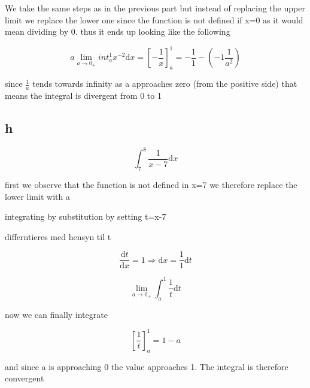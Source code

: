 \documentclass[12pt,a4paper]{article}
\begin{document}
We take the same steps as in the previous part but instead of replacing the upper limit we replace the lower one since the function is not defined if x=0 as it would mean dividing by 0. thus it ends up looking like the following


\begin{equation} \label{}
a \lim_{a\to0_+}int_{a}^{1}x^{-2}\mathrm{d}x=\left[-\frac{1}{x}\right]_{a}^{1}=-\frac{1}{1}-(-1\frac{1}{a^2})
\end{equation}

since \begin{math}
\frac{1}{a}
\end{math} tends towards infinity as a approaches zero (from the positive side) that means the integral is divergent from 0 to 1



\subsection{h}

\begin{equation} \label{}
\int_{7}^{8}\frac{1}{x-7}\mathrm{d}x
\end{equation}

first we observe that the function is not defined in x=7 we therefore replace the lower limit with a

integrating by substitution by setting t=x-7


differntieres med hensyn til t

\begin{equation} \label{}
\frac{\mathrm{d}t}{\mathrm{d}x}=1 \Rightarrow \mathrm{d}x=\frac{1}{1} \mathrm{d}t
\end{equation}

\begin{equation} \label{}
\lim_{a\to0_+} \int_{a}^{1}\frac{1}{t} \mathrm{d}t
\end{equation}

now we can finally integrate

\begin{equation} \label{}
\left[\frac{1}{t}\right]_{a}^{1}=1-a
\end{equation}

and since a is approaching 0 the value approaches 1. The integral is therefore convergent
\end{document}

